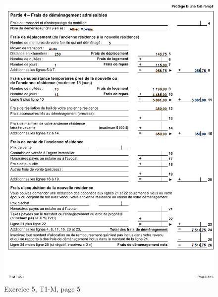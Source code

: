 \begin{figure}
	\centering
	\includegraphics[width=.9\textwidth]{exercice/3-5/Q5/T1-M-p5.png}
	\caption{Exercice 5, T1-M, page 5}
	\label{fig:chap3Exercice5T1M5}
\end{figure}
